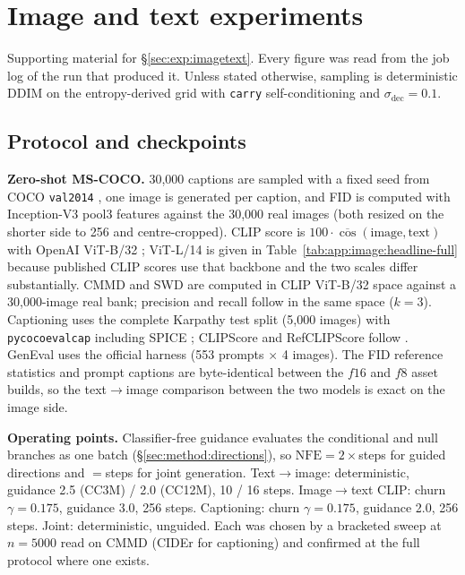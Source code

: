 \section{Image and text experiments}
\label{app:image}

Supporting material for \S\ref{sec:exp:imagetext}. Every figure was read from the job log of the
run that produced it. Unless stated otherwise, sampling is deterministic DDIM on the
entropy-derived grid with \texttt{carry} self-conditioning and $\sigma_{\mathrm{dec}}{=}0.1$.

\subsection{Protocol and checkpoints}
\label{app:image:protocol}

\textbf{Zero-shot MS-COCO.} 30{,}000 captions are sampled with a fixed seed from COCO
\texttt{val2014} \citep{image:mscoco}, one image is generated per caption, and FID
\citep{image:fid} is computed with Inception-V3 pool3 features against the 30{,}000 real images
(both resized on the shorter side to 256 and centre-cropped). CLIP score is
$100\cdot\overline{\cos}(\text{image},\text{text})$ with OpenAI ViT-B/32 \citep{image:clip};
ViT-L/14 is given in Table~\ref{tab:app:image:headline-full} because published CLIP scores use
that backbone and the two scales differ substantially. CMMD \citep{image:cmmd} and SWD are
computed in CLIP ViT-B/32 space against a 30{,}000-image real bank; precision and recall follow
\citet{image:precision-recall} in the same space ($k{=}3$). Captioning uses the complete Karpathy
test split (5{,}000 images) with \texttt{pycocoevalcap} including SPICE \citep{image:spice};
CLIPScore and RefCLIPScore follow \citet{image:clipscore}. GenEval \citep{image:geneval} uses the
official harness (553 prompts $\times$ 4 images). The FID reference statistics and prompt captions
are byte-identical between the $f16$ and $f8$ asset builds, so the text$\rightarrow$image
comparison between the two models is exact on the image side.

\textbf{Operating points.} Classifier-free guidance evaluates the conditional and null branches
as one batch (\S\ref{sec:method:directions}), so $\mathrm{NFE}=2\times$steps for guided
directions and $=$steps for joint generation. Text$\rightarrow$image: deterministic, guidance 2.5
(CC3M) / 2.0 (CC12M), 10 / 16 steps. Image$\rightarrow$text CLIP: churn $\gamma{=}0.175$,
guidance 3.0, 256 steps. Captioning: churn $\gamma{=}0.175$, guidance 2.0, 256 steps. Joint:
deterministic, unguided. Each was chosen by a bracketed sweep at $n{=}5000$ read on CMMD (CIDEr
for captioning) and confirmed at the full protocol where one exists.

